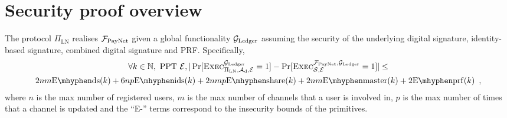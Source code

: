 \section{Security proof overview}
\label{sec:ov-security-proof}
  \begin{theorem}
The protocol $\Pi_{\mathrm{LN}}$ realises $\mathcal{F}_{\mathrm{PayNet}}$
given a global functionality $\mathcal{G}_{\mathrm{Ledger}}$
assuming the security of the underlying digital signature, identity-based signature, 
combined digital signature and PRF. Specifically, 
    \label{theorem:simulation}
    \begin{gather*}
      \forall k \in \mathbb{N}, \text{ PPT } \environment, 
      |\Pr[\textsc{Exec}^{\ledger}_{\Pi_{\mathrm{LN}}, \adversary_{\mathrm{d}},
      \environment} = 1] - \Pr[\textsc{Exec}^{\fpaynet, \ledger}_{\simulator,
      \environment} = 1]| \leq \\
      2nm  \mathrm{E \mhyphen ds}(k)  + 6np  \mathrm{E \mhyphen ids}(k) +
      2nmp  \mathrm{E \mhyphen share}(k) + 2nm \mathrm{E \mhyphen master}(k)+  2 \mathrm{E \mhyphen
      prf}(k)  \enspace,
    \end{gather*}
    where $n$ is the max number of registered users, 
    $m$ is the max number of channels that a user is involved in,
    $p$ is the max number of times that a channel is updated
    and the ``E-'' terms correspond to the insecurity bounds of the
    primitives. 
  \end{theorem}

